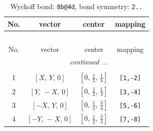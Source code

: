 \documentclass[fleqn,8pt]{jsarticle}
\begin{document}
\renewcommand{\arraystretch}{1.2}
\begin{longtable}{cccc}
\caption{Wyckoff bond: {\tt 8b@4d}, bond symmetry: {\tt 2..}}
 \\
 \hline \hline
No. & vector & center & mapping \\ \hline \endfirsthead

\multicolumn{3}{l}{\tablename\ \thetable{}} \\
 \hline \hline
No. & vector & center & mapping \\ \hline \endhead

 \hline \hline
\multicolumn{3}{r}{\footnotesize\it continued ...} \\ \endfoot

 \hline \hline
\multicolumn{3}{r}{} \\ \endlastfoot

1 & $\left[ X,\, Y,\, 0 \right]$ & $\left[ 0,\, \frac{1}{2},\, \frac{1}{4} \right]$ & {\tt [1,-2]} \\ \hline
2 & $\left[ Y,\, - X,\, 0 \right]$ & $\left[ 0,\, \frac{1}{2},\, \frac{1}{4} \right]$ & {\tt [3,-4]} \\ \hline
3 & $\left[ - X,\, Y,\, 0 \right]$ & $\left[ 0,\, \frac{1}{2},\, \frac{3}{4} \right]$ & {\tt [5,-6]} \\ \hline
4 & $\left[ - Y,\, - X,\, 0 \right]$ & $\left[ 0,\, \frac{1}{2},\, \frac{3}{4} \right]$ & {\tt [7,-8]} \\
\end{longtable}
\renewcommand{\arraystretch}{1.2}
\end{document}
